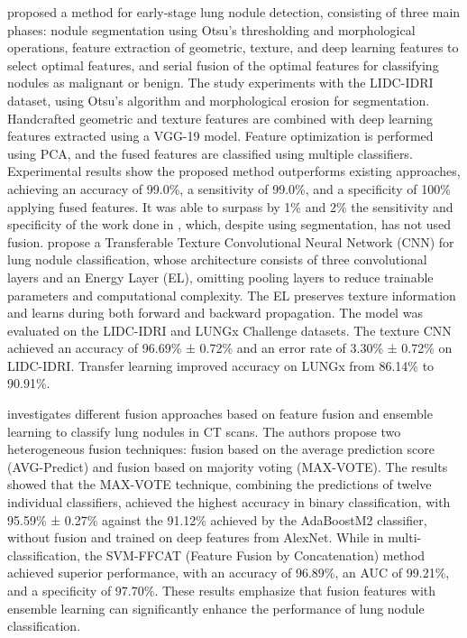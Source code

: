 \citet{Saba2019} proposed a method for early-stage lung nodule detection, consisting of three main phases: nodule segmentation using Otsu's thresholding and morphological operations, feature extraction of geometric, texture, and deep learning features to select optimal features, and serial fusion of the optimal features for classifying nodules as malignant or benign. The study experiments with the LIDC-IDRI dataset, using Otsu's algorithm and morphological erosion for segmentation. Handcrafted geometric and texture features are combined with deep learning features extracted using a VGG-19 model. Feature optimization is performed using PCA, and the fused features are classified using multiple classifiers. Experimental results show the proposed method outperforms existing approaches, achieving an accuracy of 99.0\%,  a sensitivity of 99.0\%, and a specificity of 100\% applying fused features. It was able to surpass by 1\% and 2\% the sensitivity and specificity of the work done in \cite{Naqi2018}, which, despite using segmentation, has not used fusion.
\citet{Ali2020} propose a Transferable Texture Convolutional Neural Network (CNN) for lung nodule classification, whose architecture consists of three convolutional layers and an Energy Layer (EL), omitting pooling layers to reduce trainable parameters and computational complexity. The EL preserves texture information and learns during both forward and backward propagation. The model was evaluated on the LIDC-IDRI and LUNGx Challenge datasets. The texture CNN achieved an accuracy of 96.69\% ± 0.72\% and an error rate of 3.30\% ± 0.72\% on LIDC-IDRI. Transfer learning improved accuracy on LUNGx from 86.14\% to 90.91\%.  

\citet{Muzammil2021} investigates different fusion approaches based on feature fusion and ensemble learning to classify lung nodules in CT scans. The authors propose two heterogeneous fusion techniques: fusion based on the average prediction score (AVG-Predict) and fusion based on majority voting (MAX-VOTE). The results showed that the MAX-VOTE technique, combining the predictions of twelve individual classifiers, achieved the highest accuracy in binary classification, with 95.59\% ± 0.27\% against the 91.12\% achieved by the AdaBoostM2 classifier, without fusion and trained on deep features from AlexNet. While in multi-classification, the SVM-FFCAT (Feature Fusion by Concatenation) method achieved superior performance, with an accuracy of 96.89\%, an AUC of 99.21\%, and a specificity of 97.70\%. These results emphasize that fusion features with ensemble learning can significantly enhance the performance of lung nodule classification.

